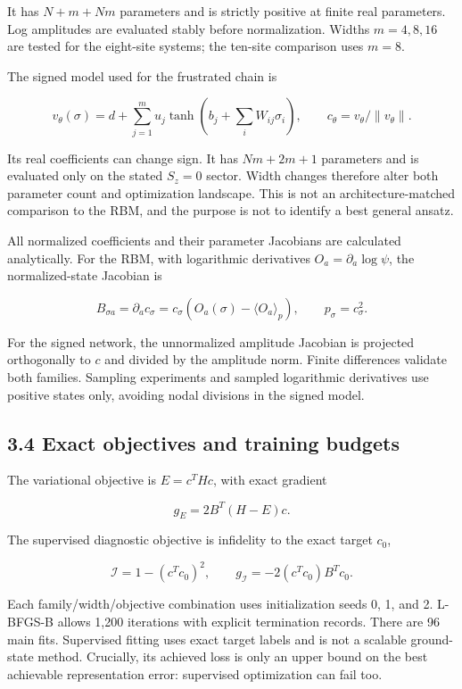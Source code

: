 \documentclass[
  11pt,
  a4paper,
]{article}
\begin{document}
It has \(N+m+Nm\) parameters and is strictly positive at finite real
parameters. Log amplitudes are evaluated stably before normalization.
Widths \(m=4,8,16\) are tested for the eight-site systems; the ten-site
comparison uses \(m=8\).

The signed model used for the frustrated chain is

\[v_\theta(\sigma)=d+\sum_{j=1}^{m}u_j\tanh\left(b_j+\sum_iW_{ij}\sigma_i\right),\qquad c_\theta=v_\theta/\|v_\theta\|.\]

Its real coefficients can change sign. It has \(Nm+2m+1\) parameters and
is evaluated only on the stated \(S_z=0\) sector. Width changes
therefore alter both parameter count and optimization landscape. This is
not an architecture-matched comparison to the RBM, and the purpose is
not to identify a best general ansatz.

All normalized coefficients and their parameter Jacobians are calculated
analytically. For the RBM, with logarithmic derivatives
\(O_a=\partial_a\log\psi\), the normalized-state Jacobian is

\[B_{\sigma a}=\partial_a c_\sigma=c_\sigma\left(O_a(\sigma)-\langle O_a\rangle_p\right),\qquad p_\sigma=c_\sigma^2.\]

For the signed network, the unnormalized amplitude Jacobian is projected
orthogonally to \(c\) and divided by the amplitude norm. Finite
differences validate both families. Sampling experiments and sampled
logarithmic derivatives use positive states only, avoiding nodal
divisions in the signed model.

\hypertarget{exact-objectives-and-training-budgets}{%
\subsection{3.4 Exact objectives and training
budgets}\label{exact-objectives-and-training-budgets}}

The variational objective is \(E=c^THc\), with exact gradient

\[g_E=2B^T(H-E)c.\]

The supervised diagnostic objective is infidelity to the exact target
\(c_0\),

\[\mathcal I=1-(c^Tc_0)^2,\qquad g_{\mathcal I}=-2(c^Tc_0)B^Tc_0.\]

Each family/width/objective combination uses initialization seeds 0, 1,
and 2. L-BFGS-B allows 1,200 iterations with explicit termination
records. There are 96 main fits. Supervised fitting uses exact target
labels and is not a scalable ground-state method. Crucially, its
achieved loss is only an upper bound on the best achievable
representation error: supervised optimization can fail too.
\end{document}
